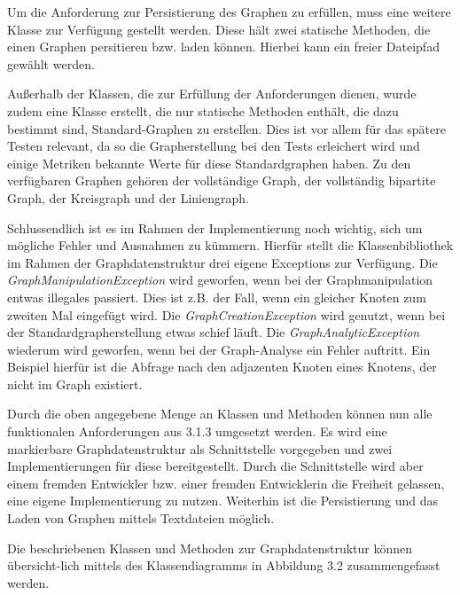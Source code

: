 \documentclass[a4paper,12pt,ngerman,chapterprefix=false,listof=totoc,bibliography=totoc]{scrreprt}
\begin{document}
{{{Um die Anforderung zur Persistierung des Graphen zu erfüllen, muss eine weitere Klasse zur Verfügung gestellt werden. Diese hält zwei statische Methoden, die einen Graphen persitieren bzw. laden können. Hierbei kann ein freier Dateipfad gewählt werden.

Außerhalb der Klassen, die zur Erfüllung der Anforderungen dienen, wurde zudem eine Klasse erstellt, die nur statische Methoden enthält, die dazu bestimmt sind, Standard-Graphen zu erstellen. Dies ist vor allem für das spätere Testen relevant, da so die Grapherstellung bei den Tests erleichert wird und einige Metriken bekannte Werte für diese Standardgraphen haben. Zu den verfügbaren Graphen gehören der vollständige Graph, der vollständig bipartite Graph, der Kreisgraph und der Liniengraph.

Schlussendlich ist es im Rahmen der Implementierung noch wichtig, sich um mögliche Fehler und Ausnahmen zu kümmern. Hierfür stellt die Klassenbibliothek im Rahmen der Graphdatenstruktur drei eigene Exceptions zur Verfügung. Die \textit{GraphManipulationException} wird geworfen, wenn bei der Graphmanipulation entwas illegales passiert. Dies ist z.B. der Fall, wenn ein gleicher Knoten zum zweiten Mal eingefügt wird. Die \textit{GraphCreationException} wird genutzt, wenn bei der Standardgrapherstellung etwas schief läuft. Die \textit{GraphAnalyticException} wiederum wird geworfen, wenn bei der Graph-Analyse ein Fehler auftritt. Ein Beispiel hierfür ist die Abfrage nach den adjazenten Knoten eines Knotens, der nicht im Graph existiert.

Durch die oben angegebene Menge an Klassen und Methoden können nun alle funktionalen Anforderungen aus 3.1.3 umgesetzt werden. Es wird eine markierbare Graphdatenstruktur als Schnittstelle vorgegeben und zwei Implementierungen für diese bereitgestellt. Durch die Schnittstelle wird aber einem fremden Entwickler bzw. einer fremden Entwicklerin die Freiheit gelassen, eine eigene Implementierung zu nutzen. Weiterhin ist die Persistierung und das Laden von Graphen mittels Textdateien möglich.

Die beschriebenen Klassen und Methoden zur Graphdatenstruktur können übersicht-lich mittels des Klassendiagramms in Abbildung 3.2 zusammengefasst werden.
}
}}
\end{document}
